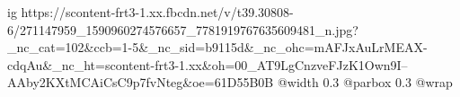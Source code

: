  
 
 
 
 

\ifcmt
  ig https://scontent-frt3-1.xx.fbcdn.net/v/t39.30808-6/271147959_1590960274576657_7781919767635609481_n.jpg?_nc_cat=102&ccb=1-5&_nc_sid=b9115d&_nc_ohc=mAFJxAuLrMEAX-cdqAu&_nc_ht=scontent-frt3-1.xx&oh=00_AT9LgCnzveFJzK1Own9I--AAby2KXtMCAiCsC9p7fvNteg&oe=61D55B0B
  @width 0.3
  @parbox 0.3
  @wrap \parpic[r]
\fi
